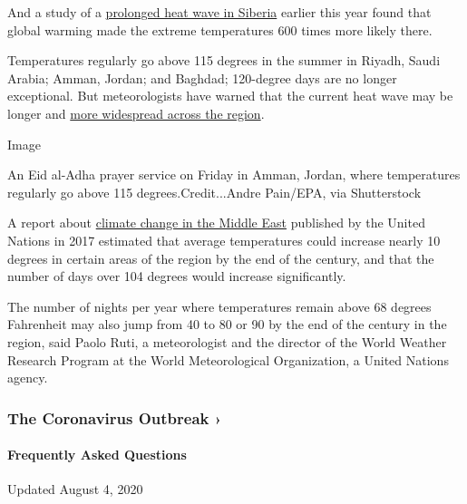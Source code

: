And a study of a
\href{https://www.nytimes3xbfgragh.onion/2020/07/15/climate/siberia-heat-wave-climate-change.html}{prolonged
heat wave in Siberia} earlier this year found that global warming made
the extreme temperatures 600 times more likely there.

Temperatures regularly go above 115 degrees in the summer in Riyadh,
Saudi Arabia; Amman, Jordan; and Baghdad; 120-degree days are no longer
exceptional. But meteorologists have warned that the current heat wave
may be longer and
\href{https://public.wmo.int/en/media/news/above-normal-temperatures-likely-over-arab-region}{more
widespread across the region}.

Image

An Eid al-Adha prayer service on Friday in Amman, Jordan, where
temperatures regularly go above 115 degrees.Credit...Andre Pain/EPA, via
Shutterstock

A report about
\href{https://www.unescwa.org/sites/www.unescwa.org/files/events/files/riccar_main_report_2017.pdf}{climate
change in the Middle East} published by the United Nations in 2017
estimated that average temperatures could increase nearly 10 degrees in
certain areas of the region by the end of the century, and that the
number of days over 104 degrees would increase significantly.

The number of nights per year where temperatures remain above 68 degrees
Fahrenheit may also jump from 40 to 80 or 90 by the end of the century
in the region, said Paolo Ruti, a meteorologist and the director of the
World Weather Research Program at the World Meteorological Organization,
a United Nations agency.

\href{https://www.nytimes3xbfgragh.onion/news-event/coronavirus?action=click\&pgtype=Article\&state=default\&region=MAIN_CONTENT_3\&context=storylines_faq}{}

\hypertarget{the-coronavirus-outbreak-}{%
\subsubsection{The Coronavirus Outbreak
›}\label{the-coronavirus-outbreak-}}

\hypertarget{frequently-asked-questions}{%
\paragraph{Frequently Asked
Questions}\label{frequently-asked-questions}}

Updated August 4, 2020

